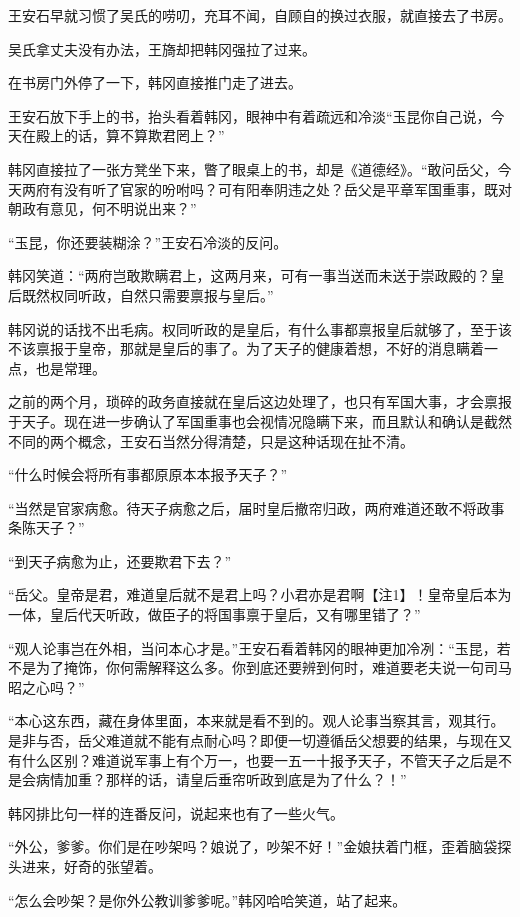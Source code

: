 王安石早就习惯了吴氏的唠叨，充耳不闻，自顾自的换过衣服，就直接去了书房。

吴氏拿丈夫没有办法，王旖却把韩冈强拉了过来。

在书房门外停了一下，韩冈直接推门走了进去。

王安石放下手上的书，抬头看着韩冈，眼神中有着疏远和冷淡“玉昆你自己说，今天在殿上的话，算不算欺君罔上？”

韩冈直接拉了一张方凳坐下来，瞥了眼桌上的书，却是《道德经》。“敢问岳父，今天两府有没有听了官家的吩咐吗？可有阳奉阴违之处？岳父是平章军国重事，既对朝政有意见，何不明说出来？”

“玉昆，你还要装糊涂？”王安石冷淡的反问。

韩冈笑道：“两府岂敢欺瞒君上，这两月来，可有一事当送而未送于崇政殿的？皇后既然权同听政，自然只需要禀报与皇后。”

韩冈说的话找不出毛病。权同听政的是皇后，有什么事都禀报皇后就够了，至于该不该禀报于皇帝，那就是皇后的事了。为了天子的健康着想，不好的消息瞒着一点，也是常理。

之前的两个月，琐碎的政务直接就在皇后这边处理了，也只有军国大事，才会禀报于天子。现在进一步确认了军国重事也会视情况隐瞒下来，而且默认和确认是截然不同的两个概念，王安石当然分得清楚，只是这种话现在扯不清。

“什么时候会将所有事都原原本本报予天子？”

“当然是官家病愈。待天子病愈之后，届时皇后撤帘归政，两府难道还敢不将政事条陈天子？”

“到天子病愈为止，还要欺君下去？”

“岳父。皇帝是君，难道皇后就不是君上吗？小君亦是君啊【注1】！皇帝皇后本为一体，皇后代天听政，做臣子的将国事禀于皇后，又有哪里错了？”

“观人论事岂在外相，当问本心才是。”王安石看着韩冈的眼神更加冷冽：“玉昆，若不是为了掩饰，你何需解释这么多。你到底还要辨到何时，难道要老夫说一句司马昭之心吗？”

“本心这东西，藏在身体里面，本来就是看不到的。观人论事当察其言，观其行。是非与否，岳父难道就不能有点耐心吗？即便一切遵循岳父想要的结果，与现在又有什么区别？难道说军事上有个万一，也要一五一十报予天子，不管天子之后是不是会病情加重？那样的话，请皇后垂帘听政到底是为了什么？！”

韩冈排比句一样的连番反问，说起来也有了一些火气。

“外公，爹爹。你们是在吵架吗？娘说了，吵架不好！”金娘扶着门框，歪着脑袋探头进来，好奇的张望着。

“怎么会吵架？是你外公教训爹爹呢。”韩冈哈哈笑道，站了起来。

